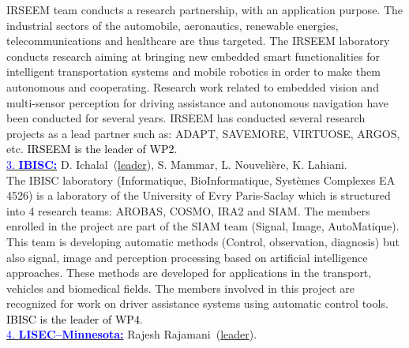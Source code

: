 \documentclass[a4paper,11pt]{article}
\begin{document}
IRSEEM team conducts a research partnership, with an application purpose. The industrial sectors of the automobile, aeronautics, renewable energies, telecommunications and healthcare are thus targeted. The IRSEEM laboratory conducts research aiming at bringing new embedded smart functionalities for intelligent transportation systems and mobile robotics in order to make them autonomous and cooperating. Research work related to embedded vision and multi-sensor perception for driving assistance and autonomous navigation have been conducted for several years. IRSEEM has conducted several research projects as a lead partner such as: ADAPT, SAVEMORE, VIRTUOSE, ARGOS, etc. \textcolor{black}{IRSEEM is the leader of WP2}.\\
%
%
%
\underline{\textcolor{blue}{3. \bf IBISC:}} D. Ichalal~(\underline{leader}), S. Mammar, L. Nouveli\`ere, K. Lahiani.\\
%
The IBISC laboratory (Informatique, BioInformatique, Syst\`emes Complexes EA 4526) is a laboratory of the University of Evry Paris-Saclay which is structured into 4 research teams: AROBAS, COSMO, IRA2 and SIAM. The members enrolled in the project are part of the SIAM team (Signal, Image, AutoMatique). This team is developing automatic methods (Control, observation, diagnosis) but also signal, image and perception processing based on artificial intelligence approaches. These methods are developed for applications in the transport, vehicles and biomedical fields. The members involved in this project are recognized for work on driver assistance systems using automatic control tools. \textcolor{black}{IBISC is the leader of WP4}.\\
%
%
\underline{\textcolor{blue}{4. \bf LISEC--Minnesota:}} Rajesh Rajamani~(\underline{leader}).\\
\end{document}
